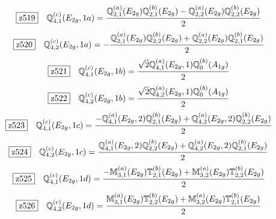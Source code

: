 \documentclass[fleqn,10pt,landscape]{jsarticle}
\begin{document}
\begin{dmath*}
\hspace*{3mm}\fbox{z519}\quad \mathbb{Q}_{4,1}^{(c)}(E_{2g},1a)=\frac{\mathbb{Q}_{2,1}^{(a)}(E_{2g}) \mathbb{Q}_{2,1}^{(b)}(E_{2g}) - \mathbb{Q}_{2,2}^{(a)}(E_{2g}) \mathbb{Q}_{2,2}^{(b)}(E_{2g})}{2}
\end{dmath*}
\begin{dmath*}
\hspace*{3mm}\fbox{z520}\quad \mathbb{Q}_{4,2}^{(c)}(E_{2g},1a)=- \frac{\mathbb{Q}_{2,1}^{(a)}(E_{2g}) \mathbb{Q}_{2,2}^{(b)}(E_{2g}) + \mathbb{Q}_{2,2}^{(a)}(E_{2g}) \mathbb{Q}_{2,1}^{(b)}(E_{2g})}{2}
\end{dmath*}
\begin{dmath*}
\hspace*{3mm}\fbox{z521}\quad \mathbb{Q}_{4,1}^{(c)}(E_{2g},1b)=\frac{\sqrt{2} \mathbb{Q}_{4,1}^{(a)}(E_{2g},1) \mathbb{Q}_{0}^{(b)}(A_{1g})}{2}
\end{dmath*}
\begin{dmath*}
\hspace*{3mm}\fbox{z522}\quad \mathbb{Q}_{4,2}^{(c)}(E_{2g},1b)=\frac{\sqrt{2} \mathbb{Q}_{4,2}^{(a)}(E_{2g},1) \mathbb{Q}_{0}^{(b)}(A_{1g})}{2}
\end{dmath*}
\begin{dmath*}
\hspace*{3mm}\fbox{z523}\quad \mathbb{Q}_{4,1}^{(c)}(E_{2g},1c)=\frac{- \mathbb{Q}_{4,1}^{(a)}(E_{2g},2) \mathbb{Q}_{2,1}^{(b)}(E_{2g}) + \mathbb{Q}_{4,2}^{(a)}(E_{2g},2) \mathbb{Q}_{2,2}^{(b)}(E_{2g})}{2}
\end{dmath*}
\begin{dmath*}
\hspace*{3mm}\fbox{z524}\quad \mathbb{Q}_{4,2}^{(c)}(E_{2g},1c)=\frac{\mathbb{Q}_{4,1}^{(a)}(E_{2g},2) \mathbb{Q}_{2,2}^{(b)}(E_{2g}) + \mathbb{Q}_{4,2}^{(a)}(E_{2g},2) \mathbb{Q}_{2,1}^{(b)}(E_{2g})}{2}
\end{dmath*}
\begin{dmath*}
\hspace*{3mm}\fbox{z525}\quad \mathbb{Q}_{4,1}^{(c)}(E_{2g},1d)=\frac{- \mathbb{M}_{3,1}^{(a)}(E_{2g}) \mathbb{T}_{2,1}^{(b)}(E_{2g}) + \mathbb{M}_{3,2}^{(a)}(E_{2g}) \mathbb{T}_{2,2}^{(b)}(E_{2g})}{2}
\end{dmath*}
\begin{dmath*}
\hspace*{3mm}\fbox{z526}\quad \mathbb{Q}_{4,2}^{(c)}(E_{2g},1d)=\frac{\mathbb{M}_{3,1}^{(a)}(E_{2g}) \mathbb{T}_{2,2}^{(b)}(E_{2g}) + \mathbb{M}_{3,2}^{(a)}(E_{2g}) \mathbb{T}_{2,1}^{(b)}(E_{2g})}{2}
\end{dmath*}
\end{document}
